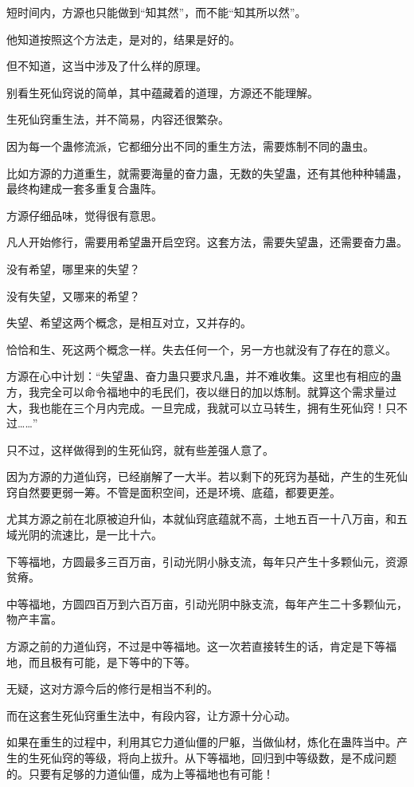 \begin{this_body}
短时间内，方源也只能做到“知其然”，而不能“知其所以然”。

他知道按照这个方法走，是对的，结果是好的。

但不知道，这当中涉及了什么样的原理。

别看生死仙窍说的简单，其中蕴藏着的道理，方源还不能理解。

生死仙窍重生法，并不简易，内容还很繁杂。

因为每一个蛊修流派，它都细分出不同的重生方法，需要炼制不同的蛊虫。

比如方源的力道重生，就需要海量的奋力蛊，无数的失望蛊，还有其他种种辅蛊，最终构建成一套多重复合蛊阵。

方源仔细品味，觉得很有意思。

凡人开始修行，需要用希望蛊开启空窍。这套方法，需要失望蛊，还需要奋力蛊。

没有希望，哪里来的失望？

没有失望，又哪来的希望？

失望、希望这两个概念，是相互对立，又并存的。

恰恰和生、死这两个概念一样。失去任何一个，另一方也就没有了存在的意义。

方源在心中计划：“失望蛊、奋力蛊只要求凡蛊，并不难收集。这里也有相应的蛊方，我完全可以命令福地中的毛民们，夜以继日的加以炼制。就算这个需求量过大，我也能在三个月内完成。一旦完成，我就可以立马转生，拥有生死仙窍！只不过……”

只不过，这样做得到的生死仙窍，就有些差强人意了。

因为方源的力道仙窍，已经崩解了一大半。若以剩下的死窍为基础，产生的生死仙窍自然要更弱一筹。不管是面积空间，还是环境、底蕴，都要更差。

尤其方源之前在北原被迫升仙，本就仙窍底蕴就不高，土地五百一十八万亩，和五域光阴的流速比，是一比十六。

下等福地，方圆最多三百万亩，引动光阴小脉支流，每年只产生十多颗仙元，资源贫瘠。

中等福地，方圆四百万到六百万亩，引动光阴中脉支流，每年产生二十多颗仙元，物产丰富。

方源之前的力道仙窍，不过是中等福地。这一次若直接转生的话，肯定是下等福地，而且极有可能，是下等中的下等。

无疑，这对方源今后的修行是相当不利的。

而在这套生死仙窍重生法中，有段内容，让方源十分心动。

如果在重生的过程中，利用其它力道仙僵的尸躯，当做仙材，炼化在蛊阵当中。产生的生死仙窍的等级，将向上拔升。从下等福地，回归到中等级数，是不成问题的。只要有足够的力道仙僵，成为上等福地也有可能！


\end{this_body}
